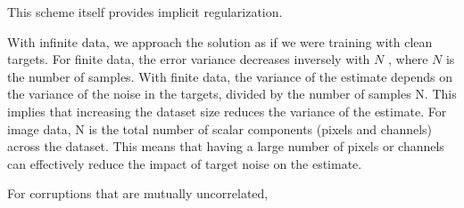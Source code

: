 This scheme itself provides implicit regularization.

With infinite data, we approach the solution as if we were training with clean targets. For finite data, the error variance decreases inversely with $N$ \cite[supplementary~material]{lehtinenNoise2NoiseLearningImage2018}, where $N$ is the number of samples. With finite data, the variance of the estimate depends on the variance of the noise in the targets, divided by the number of samples N. This implies that increasing the dataset size reduces the variance of the estimate. For image data, N is the total number of scalar components (pixels and channels) across the dataset. This means that having a large number of pixels or channels can effectively reduce the impact of target noise on the estimate.

For corruptions that are mutually uncorrelated, 




   
   







